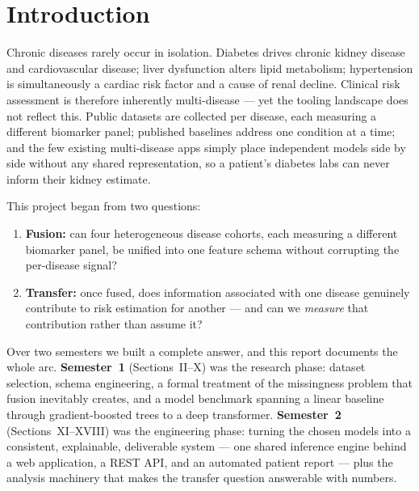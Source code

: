 \documentclass[journal]{IEEEtran}
\begin{document}
\section{Introduction}
Chronic diseases rarely occur in isolation. Diabetes drives chronic kidney disease and cardiovascular disease; liver dysfunction alters lipid metabolism; hypertension is simultaneously a cardiac risk factor and a cause of renal decline. Clinical risk assessment is therefore inherently multi-disease --- yet the tooling landscape does not reflect this. Public datasets are collected per disease, each measuring a different biomarker panel; published baselines address one condition at a time; and the few existing multi-disease apps simply place independent models side by side without any shared representation, so a patient's diabetes labs can never inform their kidney estimate.

This project began from two questions:
\begin{enumerate}
    \item \textbf{Fusion:} can four heterogeneous disease cohorts, each measuring a different biomarker panel, be unified into one feature schema without corrupting the per-disease signal?
    \item \textbf{Transfer:} once fused, does information associated with one disease genuinely contribute to risk estimation for another --- and can we \emph{measure} that contribution rather than assume it?
\end{enumerate}

Over two semesters we built a complete answer, and this report documents the whole arc. \textbf{Semester~1} (Sections~II--X) was the research phase: dataset selection, schema engineering, a formal treatment of the missingness problem that fusion inevitably creates, and a model benchmark spanning a linear baseline through gradient-boosted trees to a deep transformer. \textbf{Semester~2} (Sections~XI--XVIII) was the engineering phase: turning the chosen models into a consistent, explainable, deliverable system --- one shared inference engine behind a web application, a REST API, and an automated patient report --- plus the analysis machinery that makes the transfer question answerable with numbers.
\end{document}
